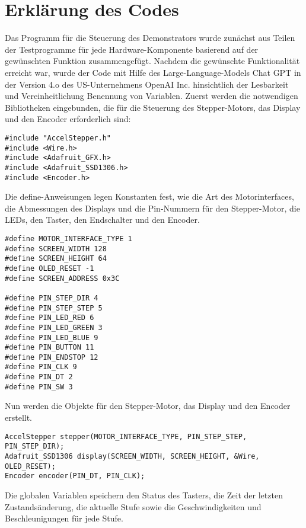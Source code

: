 \section{Erklärung des Codes}

Das Programm für die Steuerung des Demonstrators wurde zunächst aus Teilen der Testprogramme für jede Hardware-Komponente basierend auf der gewünschten Funktion zusammengefügt. Nachdem die gewünschte Funktionalität erreicht war, wurde der Code mit Hilfe des Large-Language-Models Chat GPT in der Version 4.o des US-Unternehmens OpenAI Inc. hinsichtlich der Lesbarkeit und Vereinheitlichung Benennung von Variablen.
Zuerst werden die notwendigen Bibliotheken eingebunden, die für die Steuerung des Stepper-Motors, das Display und den Encoder erforderlich sind:

\begin{lstlisting}
#include "AccelStepper.h"
#include <Wire.h>
#include <Adafruit_GFX.h>
#include <Adafruit_SSD1306.h>
#include <Encoder.h>
\end{lstlisting}

Die define-Anweisungen legen Konstanten fest, wie die Art des Motorinterfaces, die Abmessungen des Displays und die Pin-Nummern für den Stepper-Motor, die LEDs, den Taster, den Endschalter und den Encoder.

\begin{lstlisting}
#define MOTOR_INTERFACE_TYPE 1
#define SCREEN_WIDTH 128
#define SCREEN_HEIGHT 64
#define OLED_RESET -1
#define SCREEN_ADDRESS 0x3C

#define PIN_STEP_DIR 4
#define PIN_STEP_STEP 5
#define PIN_LED_RED 6
#define PIN_LED_GREEN 3
#define PIN_LED_BLUE 9
#define PIN_BUTTON 11
#define PIN_ENDSTOP 12
#define PIN_CLK 9
#define PIN_DT 2
#define PIN_SW 3
\end{lstlisting}

Nun werden die Objekte für den Stepper-Motor, das Display und den Encoder erstellt.

\begin{lstlisting}
AccelStepper stepper(MOTOR_INTERFACE_TYPE, PIN_STEP_STEP, PIN_STEP_DIR);
Adafruit_SSD1306 display(SCREEN_WIDTH, SCREEN_HEIGHT, &Wire, OLED_RESET);
Encoder encoder(PIN_DT, PIN_CLK);
\end{lstlisting}

Die globalen Variablen speichern den Status des Tasters, die Zeit der letzten Zustandsänderung, die aktuelle Stufe sowie die Geschwindigkeiten und Beschleunigungen für jede Stufe.

